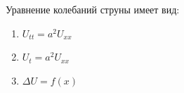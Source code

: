 Уравнение колебаний струны имеет вид:

\begin{enumerate}[label=\arabic*)]
    \item \(U_{tt}=a^2U_{xx}\)
    \item \(U_t=a^2U_{xx}\)
    \item \(\Delta U=f(x)\)
\end{enumerate}


